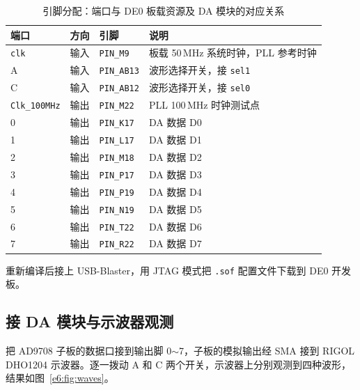 \documentclass{ctexrep}
\begin{document}
\begin{table}[H]
    \centering
    \caption{引脚分配：端口与 DE0 板载资源及 DA 模块的对应关系}
    \label{e6:tab:pins}
    \begin{tabular}{llll}
        \toprule
        \textbf{端口} & \textbf{方向} & \textbf{引脚} & \textbf{说明} \\
        \midrule
        \texttt{clk}         & 输入 & \texttt{PIN\_M9}   & 板载 50\,MHz 系统时钟，PLL 参考时钟 \\
        A                    & 输入 & \texttt{PIN\_AB13} & 波形选择开关，接 \texttt{sel1} \\
        C                    & 输入 & \texttt{PIN\_AB12} & 波形选择开关，接 \texttt{sel0} \\
        \texttt{Clk\_100MHz} & 输出 & \texttt{PIN\_M22}  & PLL 100\,MHz 时钟测试点 \\
        0                    & 输出 & \texttt{PIN\_K17}  & DA 数据 D0 \\
        1                    & 输出 & \texttt{PIN\_L17}  & DA 数据 D1 \\
        2                    & 输出 & \texttt{PIN\_M18}  & DA 数据 D2 \\
        3                    & 输出 & \texttt{PIN\_P17}  & DA 数据 D3 \\
        4                    & 输出 & \texttt{PIN\_P19}  & DA 数据 D4 \\
        5                    & 输出 & \texttt{PIN\_N19}  & DA 数据 D5 \\
        6                    & 输出 & \texttt{PIN\_T22}  & DA 数据 D6 \\
        7                    & 输出 & \texttt{PIN\_R22}  & DA 数据 D7 \\
        \bottomrule
    \end{tabular}
\end{table}

重新编译后接上 USB-Blaster，用 JTAG 模式把 \texttt{.sof} 配置文件下载到 DE0 开发板。

\subsection{接 DA 模块与示波器观测}

把 AD9708 子板的数据口接到输出脚 0$\sim$7，子板的模拟输出经 SMA 接到 RIGOL DHO1204 示波器。逐一拨动 A 和 C 两个开关，示波器上分别观测到四种波形，结果如图~\ref{e6:fig:waves}。
\end{document}
